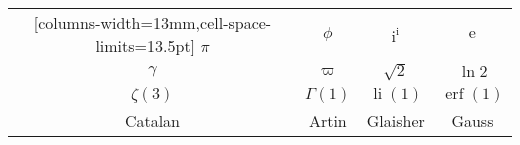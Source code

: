 \documentclass{standalone}
\begin{document}
\begin{NiceTabular}{*{4}{c}}[columns-width=13mm,cell-space-limits=13.5pt]
	\(\pi\) & \(\phi\) & \(\mathrm{i}^{\mathrm{i}}\) & \(\mathrm{e}\) \\
	\(\gamma\) & \(\varpi\) & \(\sqrt{2}\) & \(\ln{2}\) \\
	\(\zeta(3)\) & \(\Gamma(1)\) & \(\operatorname{li}(1)\) & \(\operatorname{erf}(1)\) \\
	Catalan & Artin & Glaisher & Gauss \\
\end{NiceTabular}
\end{document}
